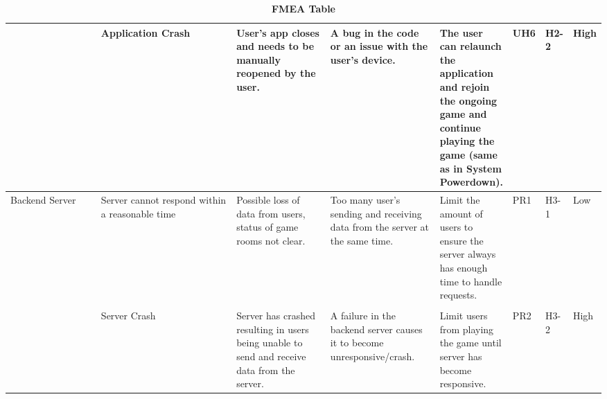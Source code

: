 \documentclass{article}
\begin{document}
\begin{table}[H]
\begin{adjustbox}{width=(/5)}
\begin{tabular}{|p{0.20\linewidth} | p{0.30\linewidth} | p{0.20\linewidth}|  p{0.20\linewidth}|  p{0.30\linewidth}|  p{0.07\linewidth}|  p{0.09\linewidth}|p{0.12\linewidth}| }
                                   &       Application Crash     &      User's app closes and needs to be manually reopened by the user.         &     A bug in the code or an issue with the user's device.     &     The user can relaunch the application and rejoin the ongoing game and continue playing the game (same as in System Powerdown).    &  UH6           &   H2-2          &   High               \\
          \hline
          Backend Server                   &    Server cannot respond within a reasonable time         &     Possible loss of data from users, status of game rooms not clear.    &    Too many user's sending and receiving data from the server at the same time.    &     Limit the amount of users to ensure the server always has enough time to handle requests.      &   PR1          &  H3-1            &      Low            \\&&&&&&&  \\
                                   &     Server Crash                   & Server has crashed resulting in users being unable to send and receive data from the server.                          &   A failure in the backend server causes it to become unresponsive/crash.                       &  Limit users from playing the game until server has become responsive.                               &  PR2           &  H3-2             &  High                 \\
          \hline
    \end{tabular}
    \end{adjustbox}
    \caption{\bf FMEA Table}
    \label{tab:FMEA1}
\end{table}
\end{document}
